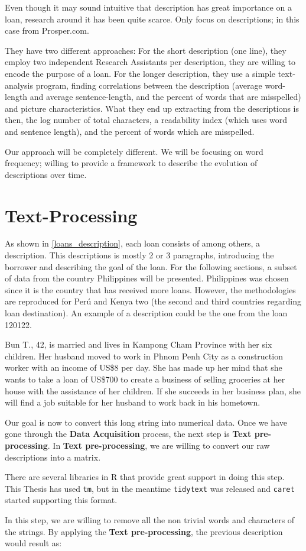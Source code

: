 Even though it may sound intuitive that description has great importance on a loan, research around it has been quite scarce. Only \parencite{Pope2011} focus on descriptions; in this case from Prosper.com. \par
They have two different approaches: For the short description (one line), they employ two independent Research Assistants per description, they are willing to encode the purpose of a loan. For the longer description, they use a simple text-analysis program, finding correlations between the description (average word-length and average sentence-length, and the percent of words that are misspelled) and picture characteristics. What they end up extracting from the descriptions is then, the log number of total characters, a readability index (which uses word and sentence length), and the percent of words which are misspelled. \par
Our approach will be completely different. We will be focusing on word frequency; willing to provide a framework to describe the evolution of descriptions over time.\par


\section{Text-Processing}
As shown in \ref{loans_description}, each loan consists of among others, a description. This descriptions is mostly 2 or 3 paragraphs, introducing the borrower and describing the goal of the loan.
For the following sections, a subset of data from the country Philippines will be presented. Philippines was chosen since it is the country that has received more loans. However, the methodologies are reproduced for Perú and Kenya two (the second and third countries regarding loan destination).
An example of a description could be the one from the loan 120122.
\begin{tcolorbox}
Bun T., 42, is married and lives in Kampong Cham Province with her six children. Her husband moved to work in Phnom Penh City as a construction worker with an income of US\$8 per day. She has made up her mind that she wants to take a loan of US\$700 to create a business of selling groceries at her house with the assistance of her children. If she succeeds in her business plan, she will find a job suitable for her husband to work back in his hometown.
\end{tcolorbox}

Our goal is now to convert this long string into numerical data. Once we have gone through the \textbf{Data Acquisition} process, the next step is \textbf{Text pre-processing}. In \textbf{Text pre-processing}, we are willing to convert our raw descriptions into a matrix. \par
There are several libraries in R that provide great support in doing this step. This Thesis has used \texttt{tm}, but in the meantime \texttt{tidytext} was released and \texttt{caret} started supporting this format. \par
In this step, we are willing to remove all the non trivial words and characters of the strings. By applying the \textbf{Text pre-processing}, the previous description would result as:


